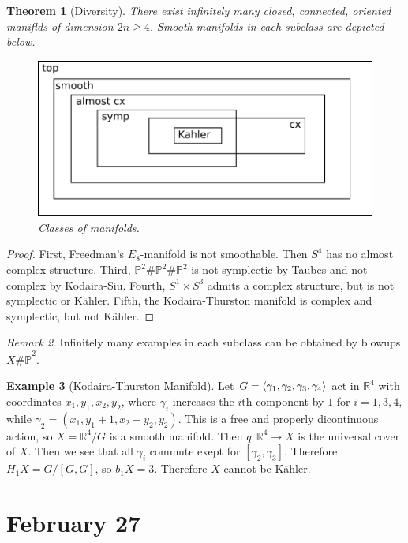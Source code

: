 \documentclass[leqno, openany]{memoir}
\DeclarePairedDelimiter{\gen}{\langle}{\rangle}
\newtheorem{thm}{Theorem}[chapter]
\theoremstyle{definition}
\newtheorem{exm}[thm]{Example}
\theoremstyle{remark}
\newtheorem{rmk}[thm]{Remark}
\theoremstyle{plain}
\theoremstyle{definition}
\theoremstyle{remark}
\newcommand{\R}{\mathbb{R}}
\renewcommand{\P}{\mathbb{P}}
\begin{document}
\begin{thm}[Diversity]
    There exist infinitely many closed, connected, oriented maniflds of dimension $2n \geq 4$. Smooth manifolds in each subclass are depicted below.
    \begin{figure}[H]
        \centering
        \includegraphics[width=0.8\linewidth]{mflds}
        \caption{Classes of manifolds.}%
        \label{fig:}
    \end{figure}
\end{thm}

\begin{proof}
    First, Freedman's $E_8$-manifold is not smoothable. Then $S^4$ has no almost complex structure. Third, $\P^2 \# \P^2 \# \P^2$ is not symplectic by Taubes and not complex by Kodaira-Siu. Fourth, $S^1 \times S^3$ admits a complex structure, but is not symplectic or K\"ahler. Fifth, the Kodaira-Thurston manifold is complex and symplectic, but not K\"ahler.
\end{proof}

\begin{rmk}
    Infinitely many examples in each subclass can be obtained by blowups $X \# \overline{\P}^2$.
\end{rmk}

\begin{exm}[Kodaira-Thurston Manifold]
    Let $G = \gen{\gamma_1, \gamma_2, \gamma_3, \gamma_4}$ act in $\R^4$ with coordinates $x_1, y_1, x_2, y_2$, where $\gamma_i$ increases the $i$th component by $1$ for $i = 1,3,4$, while $\gamma_2 = (x_1, y_1 + 1, x_2 + y_2, y_2)$. This is a free and properly dicontinuous action, so $X = \R^4 / G$ is a smooth manifold. Then $q: \R^4 \to X$ is the universal cover of $X$. Then we see that all $\gamma_i$ commute exept for $[\gamma_2, \gamma_3]$. Therefore $H_1 X = G/ [G,G]$, so $b_1 X = 3$. Therefore $X$ cannot be K\"ahler.
\end{exm}

\chapter{February 27}%
\label{cha:february_27}
\end{document}

